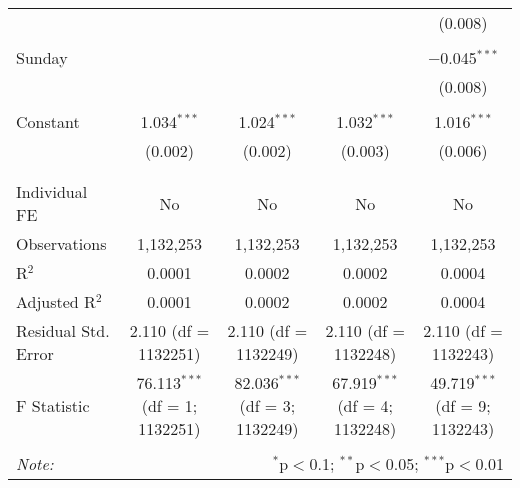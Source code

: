 \documentclass[
]{article}
\begin{document}
\begin{table}[!htbp]
{\begin{tabular}{@{\extracolsep{5pt}}lcccc}
  &  &  &  & (0.008) \\ 
  & & & & \\ 
 Sunday &  &  &  & $-$0.045$^{***}$ \\ 
  &  &  &  & (0.008) \\ 
  & & & & \\ 
 Constant & 1.034$^{***}$ & 1.024$^{***}$ & 1.032$^{***}$ & 1.016$^{***}$ \\ 
  & (0.002) & (0.002) & (0.003) & (0.006) \\ 
  & & & & \\ 
\hline \\[-1.8ex] 
Individual FE & No & No & No & No \\ 
Observations & 1,132,253 & 1,132,253 & 1,132,253 & 1,132,253 \\ 
R$^{2}$ & 0.0001 & 0.0002 & 0.0002 & 0.0004 \\ 
Adjusted R$^{2}$ & 0.0001 & 0.0002 & 0.0002 & 0.0004 \\ 
Residual Std. Error & 2.110 (df = 1132251) & 2.110 (df = 1132249) & 2.110 (df = 1132248) & 2.110 (df = 1132243) \\ 
F Statistic & 76.113$^{***}$ (df = 1; 1132251) & 82.036$^{***}$ (df = 3; 1132249) & 67.919$^{***}$ (df = 4; 1132248) & 49.719$^{***}$ (df = 9; 1132243) \\ 
\hline 
\hline \\[-1.8ex] 
\textit{Note:}  & \multicolumn{4}{r}{$^{*}$p$<$0.1; $^{**}$p$<$0.05; $^{***}$p$<$0.01} \\ 
\end{tabular}
} 
\end{table} 
\newpage
\end{document}
